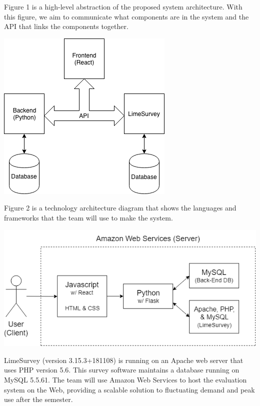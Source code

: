 \documentclass{article}
\begin{document}
Figure 1 is a high-level abstraction of the proposed system architecture. With this figure, we aim to communicate what components are in the system and the API that links the components together.

\begin{center}
\vspace{1mm}
\label{fig:componentdiagram}
{\includegraphics[scale=.65]{images/component_diagram.png}} 
\end{center}

\vspace{3mm}

Figure 2 is a technology architecture diagram that shows the languages and frameworks that the team will use to make the system.

\begin{center}
\label{fig:technologydiagram}
{\includegraphics[scale=.6]{images/technology_architecture_diagram.png}} 
\end{center}

LimeSurvey (version 3.15.3+181108) is running on an Apache web server that uses PHP version 5.6. This survey software maintains a database running on MySQL 5.5.61. The team will use Amazon Web Services to host the evaluation system on the Web, providing a scalable solution to fluctuating demand and peak use after the semester.
\end{document}
